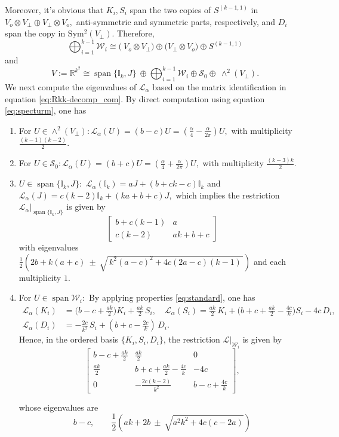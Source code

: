 \documentclass{amsart}%
\begin{document}
Moreover, it's obvious that $K_i, S_i$ span the two copies of $S^{(k-1,1)}$ in $V_o\otimes V_{\perp}\oplus V_{\perp}\otimes V_o,$ anti-symmetric and symmetric parts, respectively, and $D_i$ span the copy in $\operatorname{Sym^2}(V_{\perp})$. Therefore,
\[
\bigoplus_{i=1}^{k-1}\mathcal W_i \cong \Big(\ V_o\otimes V_{\perp}\Big)\oplus \Big(V_{\perp}\otimes V_o\Big)\oplus S^{(k-1,1)}
\]
and
\begin{equation}\label{eq:Rkk-decomp_com}
V:=\mathbb R^{k^2}\cong\operatorname{span}\{\mathbb I_k,J\}
\ \oplus \bigoplus_{i=1}^{k-1}\mathcal W_i\oplus\mathcal S_0\oplus\ 
\wedge^2(V_{\perp}).
\end{equation}
We next compute the eigenvalues of $\mathcal L_{\alpha}$ based on the matrix identification in equation \eqref{eq:Rkk-decomp_com}. By direct computation using equation \eqref{eq:specturm}, one has
\begin{enumerate}
    \item[a)] For $U\in \wedge^2(V_{\perp}): \mathcal L_{\alpha}(U)=(b-c)U=(\frac{\alpha}{4}-\frac{\alpha}{2\pi})U,$ with multiplicity $\frac{(k-1)(k-2)}{2}.$ 
    \item[b)] For $U\in \mathcal S_0: \mathcal L_{\alpha}(U)=(b+c)U=(\frac{\alpha}{4}+\frac{\alpha}{2\pi})U,$ with multiplicity $\frac{(k-3)k}{2}.$   
    \item[c)] $U\in \operatorname{span}\{\mathbb I_k,J\}:$ $\mathcal L_{\alpha}(\mathbb I_k)=aJ+(b+ck-c)\mathbb I_k$ and $\mathcal L_{\alpha}(J)=c(k-2)\mathbb I_k+(ka+b+c)J,$ which implies the restriction $\mathcal L_{\alpha}|_{\operatorname{span}\{\mathbb I_k,J\}}$ is given by
    \[
    \begin{bmatrix}
b+c(k-1) & a\\[2pt]
c(k-2) & ak+b+c
\end{bmatrix}
\]
with eigenvalues
$\frac12\!\left(2b+k(a+c)\ \pm\ \sqrt{\,k^2(a-c)^2+4c(2a-c)(k-1)\,}\right)$ and each multiplicity $1.$
\item[d)] For $U\in \operatorname{span}{\mathcal W_i:}$ By applying properties \eqref{eq:standard}, one has
\begin{equation}\label{eq:blockW}
\begin{aligned}
\mathcal L_{\alpha}(K_i)&=\Big(b-c+\tfrac{ak}{2}\Big)K_i+\tfrac{ak}{2}\,S_i,\quad
\mathcal L_{\alpha}(S_i)=\tfrac{ak}{2}\,K_i+\Big(b+c+\tfrac{ak}{2}-\tfrac{4c}{k}\Big)S_i-4c\,D_i,\\
\mathcal L_{\alpha}(D_i)&=-\tfrac{2c}{k^2}\,S_i+(b+c-\tfrac{2c}{k})\,D_i.
\end{aligned}
\end{equation}
Hence, in the ordered basis \(\{K_i,S_i,D_i\}\), the restriction \(\mathcal L|_{\mathcal W_i}\) is given by
\[
\begin{bmatrix}
b-c+\frac{ak}{2} & \frac{ak}{2} & 0\\[3pt]
\frac{ak}{2} & b+c+\frac{ak}{2}-\frac{4c}{k} & -4c\\[3pt]
0 & -\frac{2c(k-2)}{k^2} & b-c+\frac{4c}{k}
\end{bmatrix},
\]


whose eigenvalues are
\[\ b-c,\qquad
\frac12\!\left(ak+2b\ \pm\ \sqrt{a^2k^2+4c(c-2a)}\right)\ 
\]
\end{enumerate}
\end{document}
